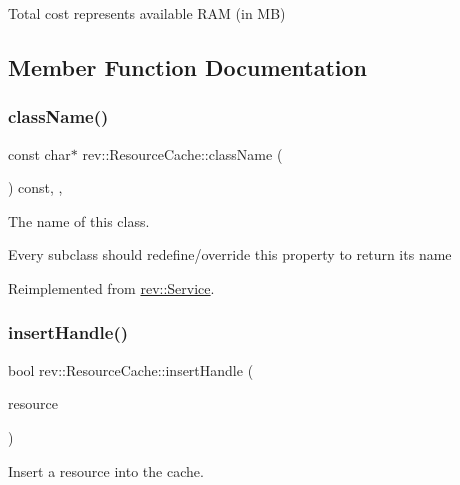 Total cost represents available R\+AM (in MB) 

\subsection{Member Function Documentation}
\mbox{\label{classrev_1_1_resource_cache_ac6abc543146d0f487cfffb79d33d35e0}} 
\subsubsection{\texorpdfstring{className()}{className()}}
{\footnotesize\ttfamily const char$\ast$ rev\+::\+Resource\+Cache\+::class\+Name (\begin{DoxyParamCaption}{ }\end{DoxyParamCaption}) const\hspace{0.3cm}{\ttfamily [inline]}, {\ttfamily [override]}, {\ttfamily [virtual]}}



The name of this class. 

Every subclass should redefine/override this property to return its name 

Reimplemented from \mbox{\hyperlink{classrev_1_1_service_a484d71757ea6e8780488602cb421a4a5}{rev\+::\+Service}}.

\mbox{\label{classrev_1_1_resource_cache_a48e9d7baa0b5c323a27aade413181f36}} 
\subsubsection{\texorpdfstring{insertHandle()}{insertHandle()}}
{\footnotesize\ttfamily bool rev\+::\+Resource\+Cache\+::insert\+Handle (\begin{DoxyParamCaption}\item[{const std\+::shared\+\_\+ptr$<$ \mbox{\hyperlink{classrev_1_1_resource_handle}{Resource\+Handle}} $>$ \&}]{resource }\end{DoxyParamCaption})}



Insert a resource into the cache. 


